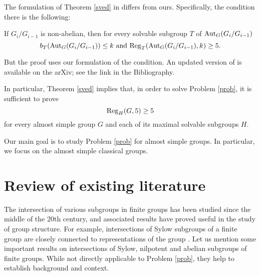 \begin{Rem}
The formulation of Theorem \ref{sved} in \cite{vd}  differs from ours. Specifically, the condition there  is the following: 
\medskip
\begin{quoting}[leftmargin=\parindent]
If $G_i/G_{i-1}$ is non-abelian, then for
every solvable subgroup $T$ of $\mathrm{Aut}_G(G_i/G_{i-1})$  
$$b_T(\mathrm{Aut}_G(G_i/G_{i-1})) \le k \mbox{ and } \mathrm{Reg}_T(\mathrm{Aut}_G(G_i/G_{i-1}),k)\ge5.$$
\end{quoting}
But the proof uses our formulation of the condition. An updated version of \cite{vd} is available on the arXiv; see the link in the Bibliography. 
\end{Rem}

In particular, Theorem \ref{sved} implies that, in order to solve Problem \ref{prob}, it is sufficient to prove $$\mathrm{Reg}_H(G,5) \ge 5$$ for every almost simple group $G$ and each of its maximal solvable subgroups $H$. 

Our main goal is to study Problem \ref{prob} for almost simple groups. In particular, we  focus on the almost simple classical groups.
 

\section{Review of existing literature}

The intersection of various subgroups in finite groups has been studied since the middle of the 20th century,  and associated results have proved useful in the study of group structure. For example, intersections of Sylow subgroups of a finite group are closely connected to representations of the group \cite{michler, strunSP}. Let us mention some important results on intersections of Sylow, nilpotent and abelian subgroups of finite groups.  While not directly applicable to  Problem \ref{prob}, they help to establish background and context. 
 
